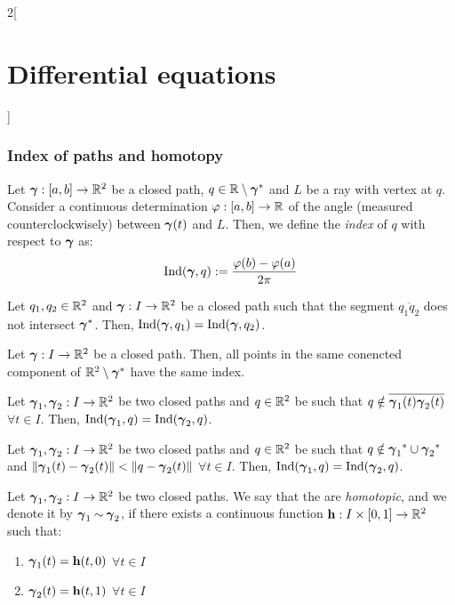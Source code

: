 \documentclass[../../../main_math.tex]{subfiles}
\begin{document}
\begin{multicols}{2}[\section{Differential equations}]
  \subsubsection{Index of paths and homotopy}
  \begin{definition}
    Let $\boldsymbol{\mathrm{\gamma}}:[a,b]\rightarrow\mathbb{R}^2$ be a closed path, $q\in \mathbb{R}\setminus\boldsymbol{\mathrm{\gamma}}^*$ and $L$ be a ray with vertex at $q$. Consider a continuous determination $\varphi:[a,b]\rightarrow\mathbb{R}$ of the angle (measured counterclockwisely) between $\boldsymbol{\mathrm{\gamma}}(t)$ and $L$. Then, we define the \emph{index} of $q$ with respect to $\boldsymbol{\mathrm{\gamma}}$ as: $$\operatorname{Ind}(\boldsymbol{\mathrm{\gamma}},q):=\frac{\varphi(b)-\varphi(a)}{2\pi}$$
  \end{definition}
  \begin{proposition}
    Let $q_1,q_2\in\mathbb{R}^2$ and $\boldsymbol{\mathrm{\gamma}}:I\rightarrow\mathbb{R}^2$ be a closed path such that the segment $\overline{q_1q_2}$ does not intersect $\boldsymbol{\mathrm{\gamma}}^*$. Then, $\operatorname{Ind}(\boldsymbol{\mathrm{\gamma}},q_1)=\operatorname{Ind}(\boldsymbol{\mathrm{\gamma}},q_2)$.
  \end{proposition}
  \begin{corollary}
    Let $\boldsymbol{\mathrm{\gamma}}:I\rightarrow\mathbb{R}^2$ be a closed path. Then, all points in the same conencted component of $\mathbb{R}^2\setminus\boldsymbol{\mathrm{\gamma}}^*$ have the same index.
  \end{corollary}
  \begin{proposition}
    Let $\boldsymbol{\mathrm{\gamma}}_1,\boldsymbol{\mathrm{\gamma}}_2:I\rightarrow\mathbb{R}^2$ be two closed paths and $q\in\mathbb{R}^2$ be such that $q\notin\overline{\boldsymbol{\mathrm{\gamma}}_1(t)\boldsymbol{\mathrm{\gamma}}_2(t)}$ $\forall t\in I$. Then, $\operatorname{Ind}(\boldsymbol{\mathrm{\gamma}}_1,q)=\operatorname{Ind}(\boldsymbol{\mathrm{\gamma}}_2,q)$.
  \end{proposition}
  \begin{proposition}
    Let $\boldsymbol{\mathrm{\gamma}}_1,\boldsymbol{\mathrm{\gamma}}_2:I\rightarrow\mathbb{R}^2$ be two closed paths and $q\in\mathbb{R}^2$ be such that $q\notin{\boldsymbol{\mathrm{\gamma}}_1}^*\cup{\boldsymbol{\mathrm{\gamma}}_2}^*$ and $\|\boldsymbol{\mathrm{\gamma}}_1(t)-\boldsymbol{\mathrm{\gamma}}_2(t)\|<\|q-\boldsymbol{\mathrm{\gamma}}_2(t)\|$ $\forall t\in I$. Then, $\operatorname{Ind}(\boldsymbol{\mathrm{\gamma}}_1,q)=\operatorname{Ind}(\boldsymbol{\mathrm{\gamma}}_2,q)$.
  \end{proposition}
  \begin{definition}
    Let $\boldsymbol{\mathrm{\gamma}}_1,\boldsymbol{\mathrm{\gamma}}_2:I\rightarrow\mathbb{R}^2$ be two closed paths. We say that the are \emph{homotopic}, and we denote it by $\boldsymbol{\mathrm{\gamma}}_1\mathbin{\sim}\boldsymbol{\mathrm{\gamma}}_2$, if there exists a continuous function $\boldsymbol{\mathrm{h}}:I\times[0,1]\rightarrow\mathbb{R}^2$ such that:
    \begin{enumerate}
      \item $\boldsymbol{\mathrm{\gamma}}_1(t)=\boldsymbol{\mathrm{h}}(t,0)$ $\forall t\in I$
      \item $\boldsymbol{\mathrm{\gamma}}_2(t)=\boldsymbol{\mathrm{h}}(t,1)$ $\forall t\in I$

\end{enumerate}
\end{definition}
\end{multicols}
\end{document}
